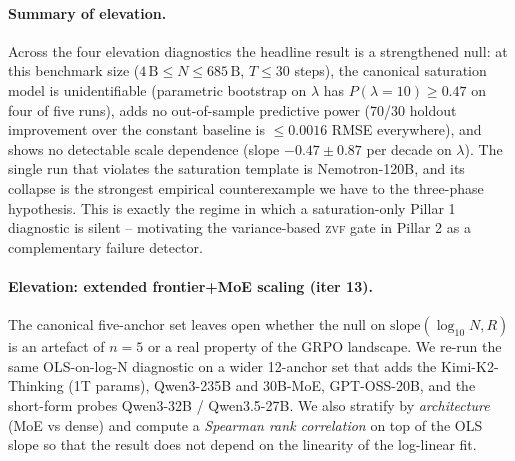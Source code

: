 \paragraph{Summary of elevation.}
\label{par:scaling-summary}
Across the four elevation diagnostics the headline result is a
strengthened null: at this benchmark size
($4\,\text{B} \le N \le 685\,\text{B}$, $T \le 30$ steps), the
canonical saturation model is unidentifiable (parametric bootstrap
on $\lambda$ has $P(\lambda = 10) \ge 0.47$ on four of five runs),
adds no out-of-sample predictive power (70/30 holdout improvement
over the constant baseline is $\le 0.0016$ RMSE everywhere), and
shows no detectable scale dependence (slope $-0.47 \pm 0.87$ per
decade on $\lambda$).  The single run that violates the saturation
template is Nemotron-120B, and its collapse is the strongest
empirical counterexample we have to the three-phase hypothesis.
This is exactly the regime in which a saturation-only Pillar 1
diagnostic is silent -- motivating the variance-based
\textsc{zvf} gate in Pillar 2 as a complementary failure detector.

\paragraph{Elevation: extended frontier+MoE scaling (iter 13).}
\label{par:scaling-extended}
The canonical five-anchor set leaves open whether the null on
$\text{slope}(\log_{10}N, R)$ is an artefact of $n = 5$ or a real
property of the GRPO landscape.  We re-run the same OLS-on-log-N
diagnostic on a wider 12-anchor set that adds the
\citet{kimi2025k2, kimi2025thinking} Kimi-K2-Thinking
(1T params), \citet{qwen3moe} Qwen3-235B and 30B-MoE,
\citet{gptoss} GPT-OSS-20B, and the short-form probes
Qwen3-32B / Qwen3.5-27B.  We also stratify by
\emph{architecture} (MoE vs dense) and compute a
\emph{Spearman rank correlation} on top of the OLS slope so that
the result does not depend on the linearity of the log-linear fit.

